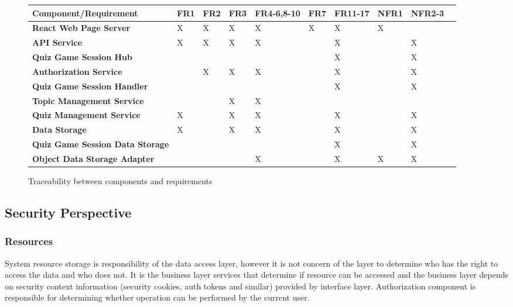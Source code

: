 \begin{figure}[H]
  \label{tab:functional-viewpoint-component-traceability}
  \centering
  \begin{adjustbox}{max width=\textwidth}
    \begin{tabular}{|l|l|l|l|l|l|l|l|l|l|}
      \hline
      \textbf{Component/Requirement} & \textbf{FR1} & \textbf{FR2} & \textbf{FR3} & \textbf{FR4-6,8-10} & \textbf{FR7} & \textbf{FR11-17} & \textbf{NFR1} & \textbf{NFR2-3} \\ \hline
      \textbf{React Web Page Server} & X & X & X & X & X & X & X & ~ \\ \hline
      \textbf{API Service} & X & X & X & X & ~ & X & ~ & X \\ \hline
      \textbf{Quiz Game Session Hub} & ~ & ~ & ~ & ~ & ~ & X & ~ & X \\ \hline
      \textbf{Authorization Service} & ~ & X & X & X & ~ & X & ~ & X \\ \hline
      \textbf{Quiz Game Session Handler} & ~ & ~ & ~ & ~ & ~ & X & ~ & X \\ \hline
      \textbf{Topic Management Service} & ~ & ~ & X & X & ~ & ~ & ~ & ~ \\ \hline
      \textbf{Quiz Management Service} & X & ~ & X & X & ~ & X & ~ & X \\ \hline
      \textbf{Data Storage} & X & ~ & X & X & ~ & X & ~ & X \\ \hline
      \textbf{Quiz Game Session Data Storage} & ~ & ~ & ~ & ~ & ~ & X & ~ & X \\ \hline
      \textbf{Object Data Storage Adapter} & ~ & ~ & ~ & X & ~ & X & X & X \\ \hline
  \end{tabular}
\end{adjustbox}
  \caption{Traceability between components and requirements}
\end{figure}

\subsection{Security Perspective}

\subsubsection{Resources}

System resource storage is responsibility of the data access layer, however it is not concern of the layer to determine who has the right to access the data and who does not. It is the business layer services that determine if resource can be accessed and the business layer depends on security context information (security cookies, auth tokens and similar) provided by interface layer. Authorization component is responsible for determining whether operation can be performed by the current user.

